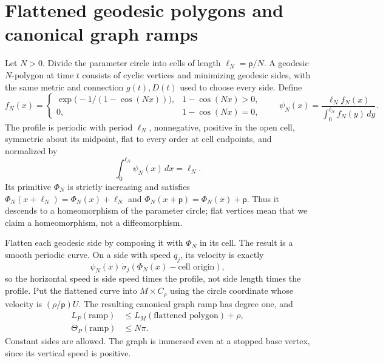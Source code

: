 \section{Flattened geodesic polygons and canonical graph ramps}
\label{sec:ramps-polygons}

Let $N>0$.  Divide the parameter circle into cells of length
$\ell_N=\mathsf p/N$.  A geodesic $N$-polygon at time $t$ consists of cyclic
vertices and minimizing geodesic sides, with the same metric and connection
$g(t),D(t)$ used to choose every side.  Define
\[
 f_N(x)=\begin{cases}
 \exp\bigl(-1/(1-\cos(Nx))\bigr),&1-\cos(Nx)>0,\\
 0,&1-\cos(Nx)=0,
 \end{cases}\qquad
 \psi_N(x)=\frac{\ell_N f_N(x)}{\int_0^{\ell_N}f_N(y)\,dy}.
\]
The profile is periodic with period $\ell_N$, nonnegative, positive in the open
cell, symmetric about its midpoint, flat to every order at cell endpoints,
and normalized by
\[
 \int_0^{\ell_N}\psi_N(x)\,dx=\ell_N.
\]
Its primitive $\Phi_N$ is strictly increasing and satisfies
$\Phi_N(x+\ell_N)=\Phi_N(x)+\ell_N$ and
$\Phi_N(x+\mathsf p)=\Phi_N(x)+\mathsf p$.  Thus it descends to a
homeomorphism of the parameter circle; flat vertices mean that we claim a
homeomorphism, not a diffeomorphism.

Flatten each geodesic side by composing it with $\Phi_N$ in its cell.  The
result is a smooth periodic curve.  On a side with speed $q_j$, its velocity
is exactly
\[
 \psi_N(x)\,\dot\sigma_j(\Phi_N(x)-\text{cell origin}),
\]
so the horizontal speed is side speed times the profile, not side length
times the profile.  Put the flattened curve into $M\times C_\rho$ using the
circle coordinate whose velocity is $(\rho/\mathsf p)U$.  The resulting
canonical graph ramp has degree one, and
\begin{align}
 L_{P}(\text{ramp})&\leq L_M(\text{flattened polygon})+\rho,\\
 \Theta_{P}(\text{ramp})&\leq N\pi.
\end{align}
Constant sides are allowed.  The graph is immersed even at a stopped base
vertex, since its vertical speed is positive.

